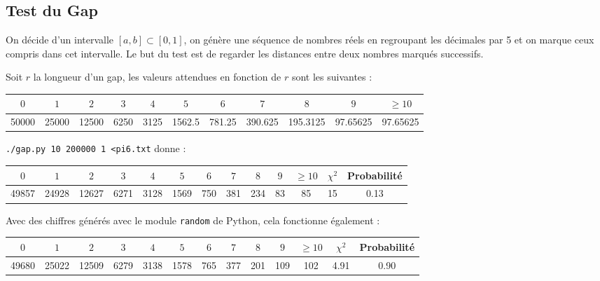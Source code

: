 \documentclass[12pt,a4paper]{article}
\begin{document}
\subsection{Test du Gap}
On décide d'un intervalle $[a,b] \subset [0,1]$,
on génère une séquence de nombres réels en regroupant les décimales par 5
et on marque ceux compris dans cet intervalle. Le but du test est de regarder les
distances entre deux nombres marqués successifs.

Soit $r$ la longueur d'un gap,
les valeurs attendues en fonction de $r$ sont les suivantes :
\begin{center}
\begin{tabular}{c|c|c|c|c|c|c|c|c|c|c}
$0$ & $1$ & $2$ & $3$ & $4$ & $5$ & $6$ & $7$ & $8$ & $9$ & $\geq 10$ \\ \hline
50000 & 25000 & 12500 & 6250 & 3125 & 1562.5 & 781.25 & 390.625 &
	195.3125 & 97.65625 & 97.65625
\end{tabular}
\end{center}

\texttt{./gap.py 10 200000 1 <pi6.txt} donne :
\begin{center}
\begin{tabular}{c|c|c|c|c|c|c|c|c|c|c|c|c}
$0$ & $1$ & $2$ & $3$ & $4$ & $5$ & $6$ & $7$ & $8$ & $9$ & $\geq 10$ &
	$\chi^2$ & Probabilité \\ \hline
49857 & 24928 & 12627 & 6271 & 3128 & 1569 & 750 & 381 & 234 & 83 & 85 &
	15 &  0.13
\end{tabular}
\end{center}

Avec des chiffres générés avec le module \texttt{random} de Python,
cela fonctionne également :
\begin{center}
\begin{tabular}{c|c|c|c|c|c|c|c|c|c|c|c|c}
$0$ & $1$ & $2$ & $3$ & $4$ & $5$ & $6$ & $7$ & $8$ & $9$ & $\geq 10$ &
	$\chi^2$ & Probabilité \\ \hline
49680 & 25022 & 12509 & 6279 & 3138 & 1578 & 765 & 377 & 201 & 109 & 102 &
	4.91 &  0.90
\end{tabular}
\end{center}
\end{document}
